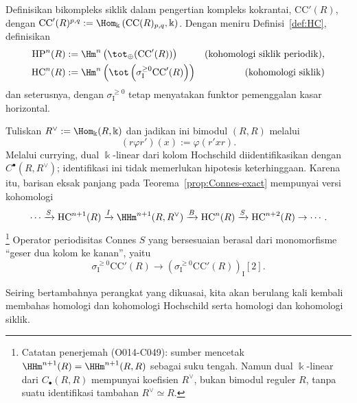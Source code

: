 \begin{catatan}
	Definisikan bikompleks siklik dalam pengertian kompleks kokrantai,
	$\mathrm{CC}'(R)$, dengan
	$\mathrm{CC}'(R)^{p,q}:=
	\Hom_{\Bbbk}\left(\mathrm{CC}(R)_{p,q},\Bbbk\right)$. Dengan meniru
	Definisi~\ref{def:HC}, definisikan
	\begin{align*}
		\mathrm{HP}^n(R)
		&:=\Hm^n\left(\tot_{\oplus}(\mathrm{CC}'(R))\right)
		&\text{(kohomologi siklik periodik)},\\
		\mathrm{HC}^n(R)
		&:=\Hm^n\left(
		\tot\left(\sigma_{\mathrm{I}}^{\geq0}\mathrm{CC}'(R)\right)\right)
		&\text{(kohomologi siklik)}
	\end{align*}
	dan seterusnya, dengan $\sigma_{\mathrm{I}}^{\geq0}$ tetap menyatakan
	funktor pemenggalan kasar horizontal.

	Tuliskan $R^\vee:=\Hom_{\Bbbk}(R,\Bbbk)$ dan jadikan ini bimodul $(R,R)$
	melalui
	\[ (r\varphi r')(x):=\varphi(r'xr). \]
	Melalui currying, dual $\Bbbk$-linear dari
	kolom Hochschild diidentifikasikan dengan
	$C^\bullet(R,R^\vee)$; identifikasi ini tidak memerlukan hipotesis
	keterhinggaan. Karena itu, barisan eksak panjang pada
	Teorema~\ref{prop:Connes-exact} mempunyai versi kohomologi
	\[ \cdots \xrightarrow{S} \mathrm{HC}^{n+1}(R)
		\xrightarrow{I} \HHm^{n+1}(R,R^\vee) \xrightarrow{B}
		\mathrm{HC}^n(R) \xrightarrow{S} \mathrm{HC}^{n+2}(R) \to \cdots. \]
	\footnote{Catatan penerjemah (O014-C049): sumber mencetak
	$\HHm^{n+1}(R)=\HHm^{n+1}(R,R)$ sebagai suku tengah. Namun dual
	$\Bbbk$-linear dari $C_\bullet(R,R)$ mempunyai koefisien
	$R^\vee$, bukan bimodul reguler $R$, tanpa suatu identifikasi tambahan
	$R^\vee\simeq R$.}
	Operator periodisitas Connes $S$ yang bersesuaian berasal dari
	monomorfisme ``geser dua kolom ke kanan'', yaitu
	\[ \sigma_{\mathrm{I}}^{\geq0}\mathrm{CC}'(R)
		\to\left(\sigma_{\mathrm{I}}^{\geq0}\mathrm{CC}'(R)\right)_{\mathrm{I}}[2]. \]
\end{catatan}

Seiring bertambahnya perangkat yang dikuasai, kita akan berulang kali kembali
membahas homologi dan kohomologi Hochschild serta homologi dan kohomologi
siklik.
